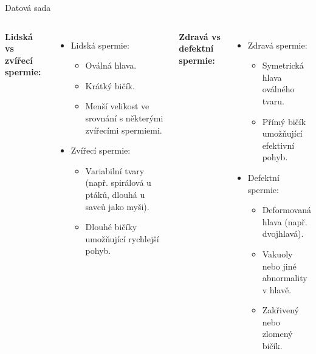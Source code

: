 \documentclass[aspectratio=169]{beamer}
\begin{document}
\begin{frame}{Datová sada}
    \begin{columns}
        \textbf{Lidská vs zvířecí spermie:}
        \begin{itemize}
            \item Lidská spermie:
            \begin{itemize}
                \item Oválná hlava.
                \item Krátký bičík.
                \item Menší velikost ve srovnání s některými zvířecími spermiemi.
            \end{itemize}
            \item Zvířecí spermie:
            \begin{itemize}
                \item Variabilní tvary (např. spirálová u ptáků, dlouhá u savců jako myši).
                \item Dlouhé bičíky umožňující rychlejší pohyb.
            \end{itemize}
        \end{itemize}

        \textbf{Zdravá vs defektní spermie:}
        \begin{itemize}
            \item Zdravá spermie:
            \begin{itemize}
                \item Symetrická hlava oválného tvaru.
                \item Přímý bičík umožňující efektivní pohyb.
            \end{itemize}
            \item Defektní spermie:
            \begin{itemize}
                \item Deformovaná hlava (např. dvojhlavá).
                \item Vakuoly nebo jiné abnormality v hlavě.
                \item Zakřivený nebo zlomený bičík.
            \end{itemize}
        \end{itemize}
    \end{columns}
\end{frame}
\end{document}
